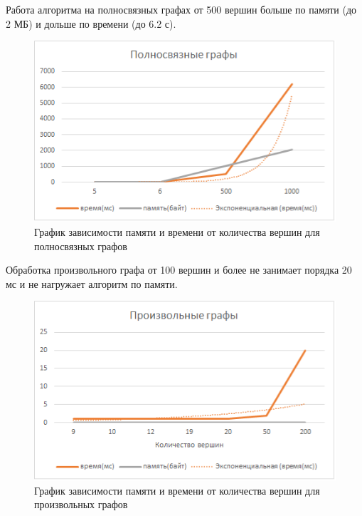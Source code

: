 \documentclass[14pt, a4paper]{extarticle}
\begin{document}
    Работа алгоритма на полносвязных графах от 500 вершин больше по памяти (до 2 МБ) и дольше по времени (до 6.2 с).

    \begin{figure}[h!]
        \centering
        \includegraphics[scale=0.6]{fullyconnected_graphs.png}
        \caption{График зависимости памяти и времени от количества вершин для полносвязных графов}
        \label{fig:my_label}
    \end{figure} 

    Обработка произвольного графа от 100 вершин и более не занимает порядка 20 мс и не нагружает алгоритм по памяти.

    \pagebreak

    \begin{figure}[h!]
        \centering
        \includegraphics[scale=0.6]{arbitrary_graphs.png}
        \caption{График зависимости памяти и времени от количества вершин для произвольных графов}
        \label{fig:my_label}
    \end{figure}
\end{document}
